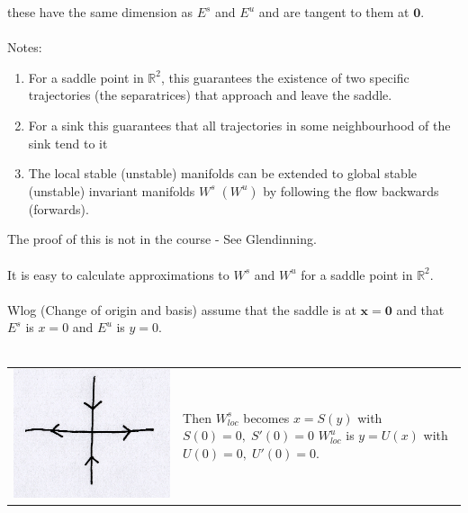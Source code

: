 \documentclass{article}
\begin{document}
these have the same dimension as $E^s$ and $E^u$ and are tangent to them
at $\bm{0}$.
\\
\\
Notes:
\begin{enumerate}[(1)]
\item For a saddle point in $\mathbb{R}^2$, this guarantees the existence of
two specific trajectories (the separatrices) that approach and leave the saddle.
\item For a sink this guarantees that all trajectories in some neighbourhood of the
sink tend to it
\item The local stable (unstable) manifolds can be extended to global 
stable (unstable) invariant manifolds $W^s \; (W^u)$ by following the flow 
backwards (forwards).
\end{enumerate}
The proof of this is not in the course - See Glendinning.
\\
\\
It is easy to calculate approximations to $W^s$ and $W^u$ for a saddle point
in $\mathbb{R}^2$.
\\
\\
Wlog (Change of origin and basis) assume that the saddle is at $\bm{x}=\bm{0}$
and that $E^s$ is $x=0$ and $E^u$ is $y=0$.
\\
\\
\begin{tabular}{ m{4.5cm} m{9cm}  } 
\includegraphics[scale = 0.15]{fig14.png}  & 

Then $W^s_{loc}$ becomes $x = S(y)$ with $S(0) =0, \; S'(0)=0$ 
$W^u_{loc}$ is $y = U(x)$ with $U(0) =0, \; U'(0)=0$.
\end{tabular}
\end{document}
